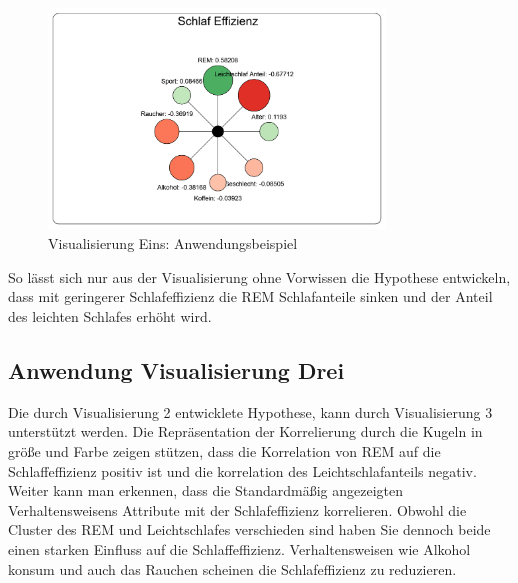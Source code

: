 \documentclass[usegeometry=true]{scrartcl}
\begin{document}
\begin{figure}[h]

  \centering
  \includegraphics [width = 0.8\textwidth]{Bsp_ImpactGraph.JPG}
  \caption{Visualisierung Eins: Anwendungsbeispiel}

  
\end{figure}

So lässt sich nur aus der Visualisierung ohne Vorwissen die Hypothese entwickeln, dass mit geringerer Schlafeffizienz die REM Schlafanteile sinken und der Anteil des leichten Schlafes erhöht wird.

\subsection{Anwendung Visualisierung Drei}

Die durch Visualisierung 2 entwicklete Hypothese, kann durch Visualisierung 3 unterstützt werden. 
Die Repräsentation der Korrelierung durch die Kugeln  in größe und Farbe zeigen stützen, dass die Korrelation von REM auf die Schlaffeffizienz positiv ist und die korrelation des Leichtschlafanteils negativ. 
Weiter kann man erkennen, dass die Standardmäßig angezeigten Verhaltensweisens Attribute mit der Schlafeffizienz korrelieren. 
Obwohl die Cluster des REM und Leichtschlafes verschieden sind haben Sie dennoch beide einen starken Einfluss auf die Schlaffeffizienz.
Verhaltensweisen wie Alkohol konsum und auch das Rauchen scheinen die Schlafeffizienz zu reduzieren.
\end{document}
